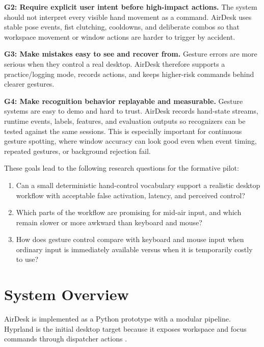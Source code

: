 \documentclass[manuscript]{acmart}
\begin{document}
\textbf{G2: Require explicit user intent before high-impact actions.} The system should not interpret every visible hand movement as a command. AirDesk uses stable pose events, fist clutching, cooldowns, and deliberate combos so that workspace movement or window actions are harder to trigger by accident.

\textbf{G3: Make mistakes easy to see and recover from.} Gesture errors are more serious when they control a real desktop. AirDesk therefore supports a practice/logging mode, records actions, and keeps higher-risk commands behind clearer gestures.

\textbf{G4: Make recognition behavior replayable and measurable.} Gesture systems are easy to demo and hard to trust. AirDesk records hand-state streams, runtime events, labels, features, and evaluation outputs so recognizers can be tested against the same sessions. This is especially important for continuous gesture spotting, where window accuracy can look good even when event timing, repeated gestures, or background rejection fail.

These goals lead to the following research questions for the formative pilot:

\begin{enumerate}
  \item Can a small deterministic hand-control vocabulary support a realistic desktop workflow with acceptable false activation, latency, and perceived control?
  \item Which parts of the workflow are promising for mid-air input, and which remain slower or more awkward than keyboard and mouse?
  \item How does gesture control compare with keyboard and mouse input when ordinary input is immediately available versus when it is temporarily costly to use?
\end{enumerate}

\section{System Overview}

AirDesk is implemented as a Python prototype with a modular pipeline. Hyprland is the initial desktop target because it exposes workspace and focus commands through dispatcher actions \cite{hyprlanddispatchers}.
\end{document}
